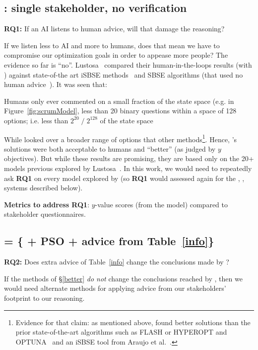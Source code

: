 \subsection{: single stakeholder, no verification}
\begin{formal}
{\bf RQ1:} If an AI listens to human advice,
will that damage the reasoning?
\end{formal}
If we listen less to AI and more to humans,
does that mean we have to compromise
our optimization goals in order to appease
more people?
The evidence so far is ``no''.  
Lustosa~\cite{lustosa21,lustosa22}  compared
their human-in-the-loops 
results (with {}) against state-of-the
art iSBSE methods~\cite{lustosa21}
and SBSE algorithms (that used no
  human advice~\cite{lustosa22}).
It was seen that:
\bi
\item
Humans only
ever commented on a small fraction of the state space (e.g. in
Figure~\ref{fig:scrumModel},
less than 
20 binary questions within a space of
128 options; i.e. less than $2^{20}\;/\;2^{128}$ of the state space
\item
While 
{} looked over a broader range
of options that other methods\footnote{ Evidence for that claim: as mentioned above,
{} found better solutions than
the prior state-of-the-art algorithms
such   as FLASH or HYPEROPT and OPTUNA~\cite{bergstra2015hyperopt,nair18,akiba2019optuna} and 
an iSBSE tool from  Araujo et al.~\cite{araujo2017architecture}.}.
\ei
Hence, {}'s solutions were  both
     acceptable to humans
and   ``better''  (as judged by   $y$ objectives). 
But while these results are promising, they 
are based only on the   20+ models previous explored by Lustosa~\cite{lustosa21,lustosa22}. In this work, we would need to repeatedly ask
{\bf RQ1} on every model explored by {\IT}
(so {\bf RQ1} would  assessed again
for  the , ,  systems described below).

{\bf Metrics to address  RQ1}: $y$-value scores (from the model) compared to stakeholder questionnaires.

\subsection{ = \{ + PSO + advice from Table~\ref{info}\}}


\begin{formal}
{\bf RQ2:} Does extra advice of Table~\ref{info} change the conclusions made by {}?
\end{formal}
If the methods of \S\ref{better}
{\em do not} change the conclusions reached  by {\IT}, then we would need alternate methods for applying advice from our stakeholders' footprint to our reasoning.

